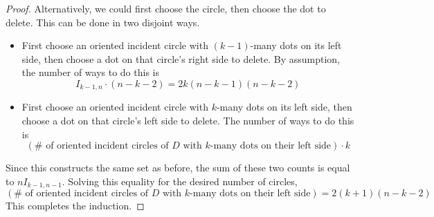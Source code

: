 \documentclass[10pt,a4paper]{amsart}
\begin{document}
\begin{proof}
Alternatively, we could first choose the circle, then choose the dot to delete. This can be done in two disjoint ways.
    \begin{itemize}
        \item First choose an oriented incident circle with $(k-1)$-many dots on its left side, then choose a dot on that circle's right side to delete. By assumption, the number of ways to do this is
        \[
        I_{k-1,n}\cdot (n-k-2) = 2k(n-k-1)(n-k-2)
        \]
        \item First choose an oriented incident circle with $k$-many dots on its left side, then choose a dot on that circle's left side to delete. The number of ways to do this is
        \[
        (\text{$\#$ of oriented incident circles of $D$ with $k$-many dots on their left side})\cdot k
        \]
    \end{itemize}
Since this constructs the same set as before, the sum of these two counts is equal to $nI_{k-1,n-1}$. Solving this equality for the desired number of circles,
\[
(\text{$\#$ of oriented incident circles of $D$ with $k$-many dots on their left side})
=2(k+1)(n-k-2)%
\]
This completes the induction.
\end{proof}
\end{document}

